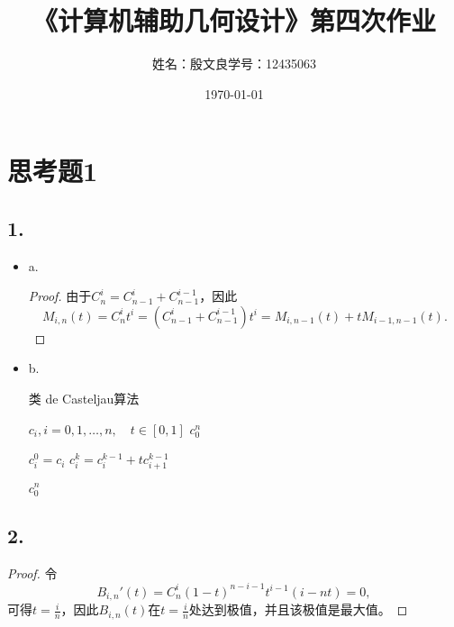 \documentclass[utf8]{ctexart}
\title{《计算机辅助几何设计》第四次作业}
\author{姓名：殷文良\qquad 学号：12435063}
\date{\today}
\begin{document}
\maketitle
{}

\section*{思考题1}
\subsection*{1.}
\begin{itemize}
    \item a.
    \begin{proof}
        由于$C_n^i = C_{n-1}^i + C_{n-1}^{i-1}$，因此
        \begin{equation*}
            M_{i,n}(t) = C_n^it^i
            = (C_{n-1}^i + C_{n-1}^{i-1})t^i
            = M_{i,n-1}(t) + tM_{i-1,n-1}(t).
        \end{equation*}
    \end{proof}
    \item b.
    \begin{algorithm}
        \caption{类 de Casteljau算法}
        \label{alg1}
        \renewcommand{\algorithmicrequire}{\textbf{Input:}}
        \renewcommand{\algorithmicensure}{\textbf{Output:}}
        \begin{algorithmic}[1]
            \REQUIRE $c_i,i=0,1,\dots,n,\quad t\in[0,1]$
            \ENSURE $c_0^n$

            \STATE $c_i^0=c_i$
            \ENDFOR
            \STATE $c_i^k = c_{i}^{k-1} + tc_{i+1}^{k-1}$
            \ENDFOR
            \ENDFOR

            \RETURN $c_0^n$
        \end{algorithmic}
    \end{algorithm}
\end{itemize}

\subsection*{2.}
\begin{proof}
    令
    \begin{equation*}
        B_{i,n}'(t) = C_n^i(1-t)^{n-i-1}t^{i-1}(i-nt) = 0,
    \end{equation*}
    可得$t=\frac{i}{n}$，因此$B_{i,n}(t)$在$t=\frac{i}{n}$处达到极值，并且该极值是最大值。
\end{proof}
\end{document}
